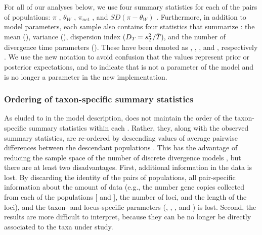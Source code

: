 \documentclass[letterpaper,12pt]{article}
\begin{document}
\begin{linenumbers}
For all of our analyses below, we use four summary statistics for each of
the pairs of populations:
$\pi$ \citep{Tajima1983}, $\theta_W$ \citep{Watterson1975}, $\pi_{net}$
\citep{Takahata1985}, and $SD(\pi-\theta_W)$ \citep{Tajima1989}.
Furthermore, in addition to model parameters, each sample \hpvector{}
also contains four statistics that summarize \divTimeMapVector:
the mean (\divTimeMean), variance (\divTimeVar), dispersion index
($D_{T_{}} = s^{2}_{T_{}}/\bar{T_{}}$), and the number
of divergence time parameters (\divTimeNum).
These have been denoted as \meant{}{}, \vart{}{}, \vmratio{}, and \numt{},
respectively \citep{Hickerson2006,Huang2011,Oaks2012}.
We use the new notation to avoid confusion that the values represent prior or
posterior expectations, and to indicate that \vmratio{} is not a parameter of
the model and \numt{} is no longer a parameter in the new implementation.

\subsubsection*{Ordering of taxon-specific summary statistics}
As eluded to in the model description, \msb does not maintain the order of the
taxon-specific summary statistics \alignmentSS{}{} within each \ssVector{}.
Rather, they, along with the observed summary statistics, are re-ordered by
descending values of average pairwise differences between the descendant
populations \citep[$\pi_b$;][]{NeiLi1979,Huang2011}.
This has the advantage of reducing the sample space of the number of discrete
divergence models \divTimeMapVector, but there are at least two disadvantages.
First, additional information in the data is lost.
By discarding the identity of the \npairs{} pairs of populations, all
pair-specific information about the amount of data (e.g., the number gene
copies collected from each of the populations [ and
], the number of loci, and the length of the loci), and the
taxon- and locus-specific parameters (\hkyModel{}{},
\mutationRateScalarConstant{}{}, \ploidyScalar{}{}, and
\locusMutationRateScalar{}) is lost.
Second, the results are more difficult to interpret, because they can be no
longer be directly associated to the taxa under study.


\end{linenumbers}
\end{document}
